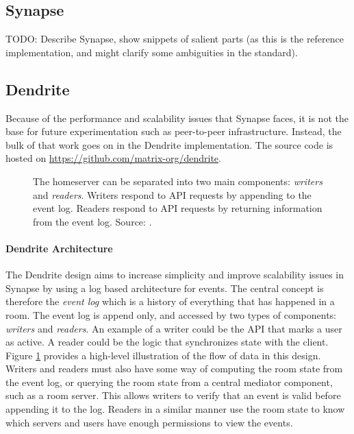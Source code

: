 \subsection{Synapse}
TODO:
    Describe Synapse, show snippets of salient parts (as this is the reference implementation, and might clarify some ambiguities in the standard).

\subsection{Dendrite}
Because of the performance and scalability issues that Synapse faces, it is not the base for future experimentation such as peer-to-peer infrastructure.
Instead, the bulk of that work goes on in the Dendrite implementation.
The source code is hosted on \url{https://github.com/matrix-org/dendrite}.

\begin{figure}
    \centering
    \resizebox{0.9\linewidth}{!}{}
    \caption{
        The homeserver can be separated into two main components: \textit{writers} and \textit{readers}.
        Writers respond to API requests by appending to the event log.
        Readers respond to API requests by returning information from the event log.
        Source: \cite{dendrite_design_md}.
    }
    \label{fig:dendrite_design}
\end{figure}

\paragraph{Dendrite Architecture}
The Dendrite design aims to increase simplicity and improve scalability issues in Synapse by using a log based architecture for events.
The central concept is therefore the \textit{event log} which is a history of everything that has happened in a room.
The event log is append only, and accessed by two types of components: \textit{writers} and \textit{readers}.
An example of a writer could be the API that marks a user as active.
A reader could be the logic that synchronizes state with the client.
Figure \ref{fig:dendrite_design} provides a high-level illustration of the flow of data in this design.
Writers and readers must also have some way of computing the room state from the event log, or querying the room state from a central mediator component, such as a room server.
This allows writers to verify that an event is valid before appending it to the log.
Readers in a similar manner use the room state to know which servers and users have enough permissions to view the events.

